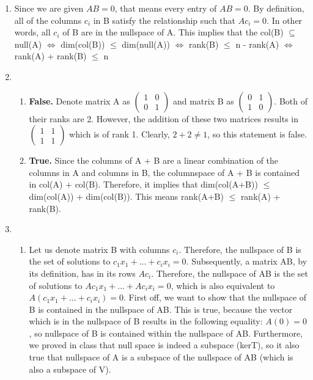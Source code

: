 \documentclass{article}
\begin{document}
\begin{enumerate}
\item Since we are given $AB = 0$, that means every entry of $AB = 0$. By definition, all of the columns $c_i$ in B satisfy the relationship such that $A c_i = 0$. In other words, all $c_i$ of B are in the nullspace of A. This implies that the col(B) $\subseteq$ null(A) $\Leftrightarrow$ dim(col(B)) $\leq$ dim(null(A)) $\Leftrightarrow$ rank(B) $\leq$ n - rank(A) $\Leftrightarrow$ rank(A) + rank(B) $\leq$ n

\item

\begin{enumerate}

\item \textbf{False.} Denote matrix A as $\left(\begin{array}{cc} 1 & 0 \\ 0 & 1 \end{array}\right)$ and matrix B as $\left(\begin{array}{cc} 0 & 1 \\ 1 & 0 \end{array}\right)$. Both of their ranks are 2. However, the addition of these two matrices results in $\left(\begin{array}{cc} 1 & 1 \\ 1 & 1 \end{array}\right)$ which is of rank 1. Clearly, $2 + 2 \neq 1$, so this statement is false.

\item \textbf{True.} Since the columns of A + B are a linear combination of the columns in A and columns in B, the columnspace of A + B is contained in col(A) + col(B). Therefore, it implies that dim(col(A+B)) $\leq$ dim(col(A)) + dim(col(B)). This means rank(A+B) $\leq$ rank(A) + rank(B).

\end{enumerate} 

\item

\begin{enumerate}

\item Let us denote matrix B with columns $c_i$. Therefore, the nullspace of B is the set of solutions to $c_1 x_1 + ... + c_i x_i = 0$. Subsequently, a matrix AB, by its definition, has in its rows $A c_i$. Therefore, the nullspace of AB is the set of solutions to $A c_1 x_1 + ... + A c_i x_i = 0$, which is also equivalent to $A (c_1 x_1 + ... + c_i x_i) = 0$. First off, we want to show that the nullspace of B is contained in the nullspace of AB. This is true, because the vector which is in the nullspace of B results in the following equality: $A (0) = 0$, so nullspace of B is contained within the nullspace of AB. Furthermore, we proved in class that null space is indeed a subspace (kerT), so it also true that nullspace of A is a subspace of the nullspace of AB (which is also a subspace of V).


\end{enumerate}
\end{enumerate}
\end{document}
